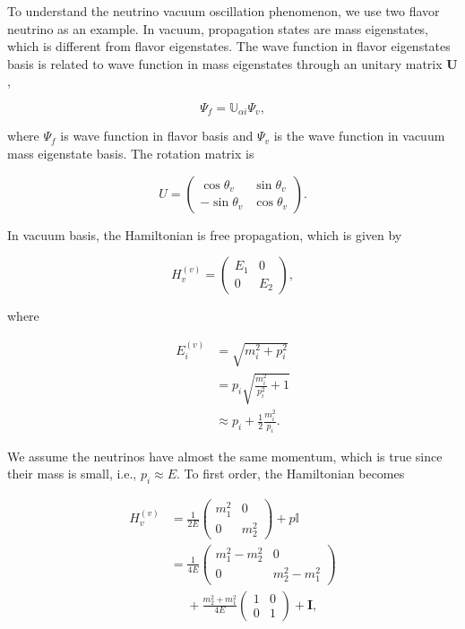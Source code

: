To understand the neutrino vacuum oscillation phenomenon, we use two flavor neutrino as an example. In vacuum, propagation states are mass eigenstates, which is different from flavor eigenstates. The wave function in flavor eigenstates basis is related to wave function in mass eigenstates through an unitary matrix $\mathbf U$,

\begin{equation}
\Psi_f = \mathbb{U}_{\alpha i}\Psi_{v},
\end{equation}

where $\Psi_f$ is wave function in flavor basis and $\Psi_v$ is the wave function in vacuum mass eigenstate basis. The rotation matrix is

\begin{equation}
U = \begin{pmatrix} \cos\theta_v & \sin \theta_v \\ -\sin \theta_v & \cos \theta_v \end{pmatrix}.
\end{equation}

In vacuum basis, the Hamiltonian is free propagation, which is given by

\begin{equation}
H_v^{(v)} = \begin{pmatrix} E_1 & 0 \\
0 & E_2
\end{pmatrix},
\end{equation}

where

\begin{align}
E_i^{(v)} & = \sqrt{m_i^2 + p_i^2 } \\
& = p_i \sqrt{\frac{m_i^2}{p_i^2} + 1} \\
& \approx p_i + \frac{1}{2} \frac{m_i^2}{p_i}.
\end{align}

We assume the neutrinos have almost the same momentum, which is true since their mass is small, i.e., $p_i \approx E$. To first order, the Hamiltonian becomes

\begin{align*}
H_v^{(v)} &= \frac{1}{2E} \begin{pmatrix}
m_1^2 & 0 \\
0 & m_2^2
\end{pmatrix} + p \mathbb{I}\\
& =  \frac{1}{4E} \begin{pmatrix}
m_1^2 - m_2^2 & 0 \\
0 & m_2^2 - m_1^2
\end{pmatrix} \\
&\phantom{=}+ \frac{m_2^2 + m_1^2}{4E} \begin{pmatrix}
1 & 0 \\
0 & 1
\end{pmatrix} + \mathbf{I},
\end{align*}

